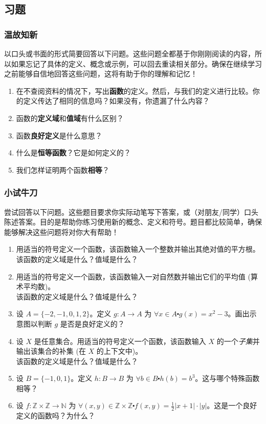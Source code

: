 
\subsection{习题}

\subsubsection*{温故知新}

以口头或书面的形式简要回答以下问题。这些问题全都基于你刚刚阅读的内容，所以如果忘记了具体的定义、概念或示例，可以回去重读相关部分。确保在继续学习之前能够自信地回答这些问题，这将有助于你的理解和记忆！

\begin{enumerate}[label=(\arabic*)]
    \item 在不查阅资料的情况下，写出\textbf{函数}的定义。然后，与我们的定义进行比较。你的定义传达了相同的信息吗？如果没有，你遗漏了什么内容？
    \item 函数的\textbf{定义域}和\textbf{值域}有什么区别？
    \item 函数\textbf{良好定义}是什么意思？
    \item 什么是\textbf{恒等函数}？它是如何定义的？
    \item 我们怎样证明两个函数\textbf{相等}？
\end{enumerate}

\subsubsection*{小试牛刀}

尝试回答以下问题。这些题目要求你实际动笔写下答案，或（对朋友/同学）口头陈述答案。目的是帮助你练习使用新的概念、定义和符号。题目都比较简单，确保能够解决这些问题将对你大有帮助！

\begin{enumerate}[label=(\arabic*)]
    \item 用适当的符号定义一个函数，该函数输入一个整数并输出其绝对值的平方根。\\
        该函数的定义域是什么？值域是什么？
    \item 用适当的符号定义一个函数，该函数输入一对自然数并输出它们的平均值 (算术平均数)。\\
        该函数的定义域是什么？值域是什么？
    \item 设 $A = \{-2, -1, 0, 1, 2\}$。定义 $g : A \to A$ 为 $\forall x \in A \centerdot g(x) = x^2 - 3$。画出示意图以判断 $g$ 是否是良好定义的？
    \item 设 $X$ 是任意集合。用适当的符号定义一个函数，该函数输入 $X$ 的一个\emph{子集}并输出该集合的补集 (在 $X$ 的上下文中)。\\
        该函数的定义域是什么？值域是什么？
    \item 设 $B = \{-1, 0, 1\}$。定义 $h : B \to B$ 为 $\forall b \in B \centerdot h(b) = b^3$。这与哪个特殊函数相等？
    \item 设 $f : \mathbb{Z} \times \mathbb{Z} \to \mathbb{N}$ 为 $\forall (x, y) \in \mathbb{Z} \times \mathbb{Z} \centerdot f(x, y) = \frac{1}{2}|x + 1| \cdot |y|$。这是一个良好定义的函数吗？为什么？
\end{enumerate}